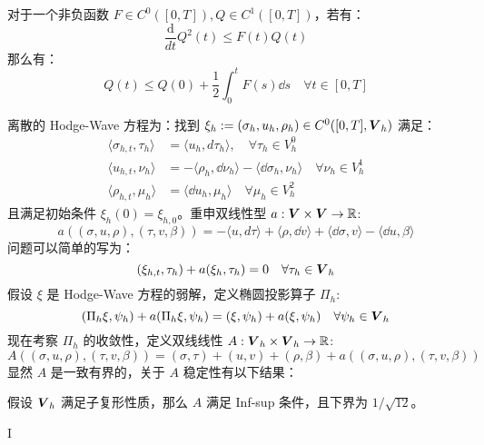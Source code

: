 \documentclass[lang=cn,a4paper,newtx]{elegantpaper}
\begin{document}
\begin{lemma}
    对于一个非负函数 $F \in C^0([0, T]), Q\in C^1([0, T])$，若有：
    $$
    \frac{\mathrm{d}}{dt}Q^2(t) \leq  F(t)Q(t)
    $$
    那么有：
    $$
    Q(t) \leq Q(0) + \frac{1}{2}\int_0^t  F(s) \dd s  \quad \forall t \in [0, T]
    $$
\end{lemma}
离散的 Hodge-Wave 方程为：找到 $\xi_h := (\sigma_h, u_h, \rho_h) \in C^0([0, T],
\boldsymbol{V}_h)$ 满足：
\begin{equation}
\label{discretehodgewave}
\begin{aligned}
    \langle \sigma_{h, t}, \tau_h\rangle &= \langle u_h, d\tau_h\rangle, \quad \forall \tau_h \in V_h^0\\
    \langle u_{h, t}, \nu_h\rangle & = -\langle \rho_h, \dd \nu_h \rangle  - \langle
    \dd \sigma_h, \nu_h\rangle  \quad \forall \nu_h \in V_h^1\\
    \langle \rho_{h, t}, \mu_h\rangle &= \langle \dd u_h, \mu_h\rangle  \quad \forall \mu_h \in V_h^2
\end{aligned}
\end{equation}
且满足初始条件 $\xi_h(0) = \xi_{h, 0}$。重申双线性型 $a: \boldsymbol{V} \times \boldsymbol{V} \to
\mathbb{R}$:
$$
a((\sigma, u, \rho), (\tau, v, \beta)) = -\langle u, d\tau\rangle + \langle
\rho, \dd v\rangle + \langle \dd \sigma, v\rangle - \langle \dd u,
\beta\rangle
$$
问题可以简单的写为：
$$
(\xi_{h, t}, \tau_h) + a(\xi_h, \tau_h) = 0 \quad \forall \tau_h \in \boldsymbol{V}_h
$$
假设 $\xi$ 是 Hodge-Wave 方程的弱解，定义椭圆投影算子 $\Pi_h$:
$$
(\Pi_h \xi, \psi_h) + a(\Pi_h \xi, \psi_h) = (\xi, \psi_h) + a(\xi, \psi_h)
\quad \forall \psi_h \in \boldsymbol{V}_h
$$
现在考察 $\Pi_h$ 的收敛性，定义双线线性 $A: \boldsymbol{V}_h \times \boldsymbol{V}_h \to \mathbb{R}$:
$$
A((\sigma, u, \rho), (\tau, v, \beta)) = (\sigma, \tau) + (u, v) + (\rho, \beta)
+ a((\sigma, u, \rho), (\tau, v, \beta))
$$
显然 $A$ 是一致有界的，关于 $A$ 稳定性有以下结果：
\begin{property}
    假设 $\boldsymbol{V}_h$ 满足子复形性质，那么 $A$ 满足 Inf-sup 条件，且下界为
    $1/\sqrt{12}$。
\end{property}I
\end{document}
